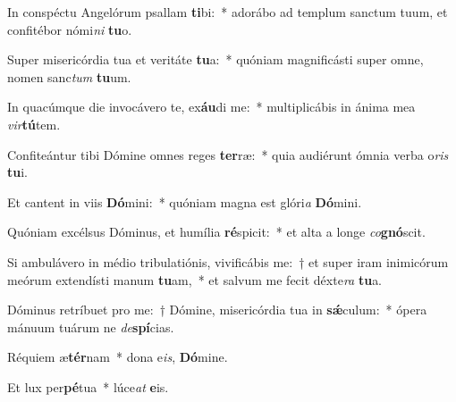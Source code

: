 \item In conspéctu Angelórum psallam \textbf{ti}bi:~* adorábo ad templum sanctum tuum, et confitébor nómi\textit{ni} \textbf{tu}o.
\item Super misericórdia tua et veritáte \textbf{tu}a:~* quóniam magnificásti super omne, nomen sanc\textit{tum} \textbf{tu}um.
\item In quacúmque die invocávero te, ex\textbf{áu}di me:~* multiplicábis in ánima mea \textit{vir}\textbf{tú}tem.
\item Confiteántur tibi Dómine omnes reges \textbf{ter}ræ:~* quia audiérunt ómnia verba o\textit{ris} \textbf{tu}i.
\item Et cantent in viis \textbf{Dó}mini:~* quóniam magna est glóri\textit{a} \textbf{Dó}mini.
\item Quóniam excélsus Dóminus, et humília \textbf{ré}spicit:~* et alta a longe \textit{co}\textbf{gnó}scit.
\item Si ambulávero in médio tribulatiónis, vivificábis me:~† et super iram inimicórum meórum extendísti manum \textbf{tu}am,~* et salvum me fecit déxte\textit{ra} \textbf{tu}a.
\item Dóminus retríbuet pro me:~† Dómine, misericórdia tua in \textbf{sǽ}culum:~* ópera mánuum tuárum ne \textit{de}\textbf{spí}cias.
\item Réquiem æ\textbf{tér}nam~* dona e\textit{is}, \textbf{Dó}mine.
\item Et lux per\textbf{pé}tua~* lúce\textit{at} \textbf{e}is.